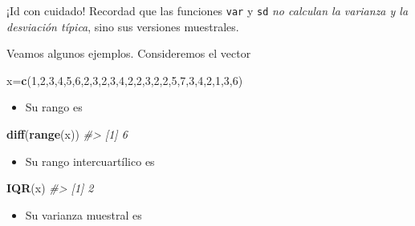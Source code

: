 \documentclass[
]{book}
\newenvironment{Shaded}{\begin{snugshade}}{\end{snugshade}}
\newcommand{\CommentTok}[1]{\textcolor[rgb]{0.56,0.35,0.01}{\textit{#1}}}
\newcommand{\DecValTok}[1]{\textcolor[rgb]{0.00,0.00,0.81}{#1}}
\newcommand{\KeywordTok}[1]{\textcolor[rgb]{0.13,0.29,0.53}{\textbf{#1}}}
\newcommand{\NormalTok}[1]{#1}
\providecommand{\tightlist}{%
  \setlength{\itemsep}{0pt}\setlength{\parskip}{0pt}}
\theoremstyle{definition}
\theoremstyle{definition}
\theoremstyle{definition}
\theoremstyle{remark}
\begin{document}
¡Id con cuidado! Recordad que las funciones \texttt{var} y \texttt{sd} \emph{no calculan la varianza y la desviación típica}, sino sus versiones muestrales.

Veamos algunos ejemplos. Consideremos el vector

\begin{Shaded}
\begin{Highlighting}[]
\NormalTok{x=}\KeywordTok{c}\NormalTok{(}\DecValTok{1}\NormalTok{,}\DecValTok{2}\NormalTok{,}\DecValTok{3}\NormalTok{,}\DecValTok{4}\NormalTok{,}\DecValTok{5}\NormalTok{,}\DecValTok{6}\NormalTok{,}\DecValTok{2}\NormalTok{,}\DecValTok{3}\NormalTok{,}\DecValTok{2}\NormalTok{,}\DecValTok{3}\NormalTok{,}\DecValTok{4}\NormalTok{,}\DecValTok{2}\NormalTok{,}\DecValTok{2}\NormalTok{,}\DecValTok{3}\NormalTok{,}\DecValTok{2}\NormalTok{,}\DecValTok{2}\NormalTok{,}\DecValTok{5}\NormalTok{,}\DecValTok{7}\NormalTok{,}\DecValTok{3}\NormalTok{,}\DecValTok{4}\NormalTok{,}\DecValTok{2}\NormalTok{,}\DecValTok{1}\NormalTok{,}\DecValTok{3}\NormalTok{,}\DecValTok{6}\NormalTok{)}
\end{Highlighting}
\end{Shaded}

\begin{itemize}
\tightlist
\item
  Su rango es
\end{itemize}

\begin{Shaded}
\begin{Highlighting}[]
\KeywordTok{diff}\NormalTok{(}\KeywordTok{range}\NormalTok{(x)) }
\CommentTok{\#\textgreater{} [1] 6}
\end{Highlighting}
\end{Shaded}

\begin{itemize}
\tightlist
\item
  Su rango intercuartílico es
\end{itemize}

\begin{Shaded}
\begin{Highlighting}[]
\KeywordTok{IQR}\NormalTok{(x)   }
\CommentTok{\#\textgreater{} [1] 2}
\end{Highlighting}
\end{Shaded}

\begin{itemize}
\tightlist
\item
  Su varianza muestral es
\end{itemize}
\end{document}
